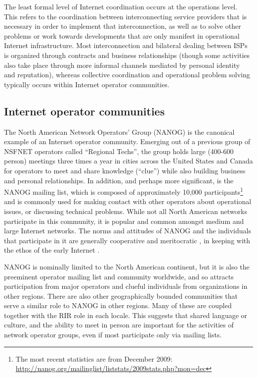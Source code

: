 The least formal level of Internet coordination occurs at the operations level.
This refers to the coordination between interconnecting service providers that
is necessary in order to implement that interconnection, as well as to solve
other problems or work towards developments that are only manifest in
operational Internet infrastructure. Most interconnection and bilateral dealing
between ISPs is organized through contracts and business relationships (though
some activities also take place through more informal channels mediated by
personal identity and reputation), whereas collective coordination and
operational problem solving typically occurs within Internet operator
communities.

\subsection{Internet operator communities}

The North American Network Operators' Group (NANOG) is the canonical example of
an Internet operator community. Emerging out of a previous group of NSFNET
operators called ``Regional Techs'', the group holds large (400-600 person)
meetings three times a year in cities across the United States and Canada for
operators to meet and share knowledge (``clue'') while also building business
and personal relationships. In addition, and perhaps more significant, is the
NANOG mailing list, which is composed of approximately 10,000
participants\footnote{The most recent statistics are from December 2009:
\url{http://nanog.org/mailinglist/liststats/2009stats.php?mon=dec}} and is
commonly used for making contact with other operators about operational issues,
or discussing technical problems. While not all North American networks
participate in this community, it is popular and common amongst medium and large
Internet networks. The norms and attitudes of NANOG and the individuals that
participate in it are generally cooperative and meritocratic
\cite{Mathew:2010ly}, in keeping with the ethos of the early Internet
\cite{Abbate:2000ve}.

NANOG is nominally limited to the North American continent, but it is also the
preeminent operator mailing list and community worldwide, and so attracts
participation from major operators and clueful individuals from organizations
in other regions. There are also other geographically bounded communities that
serve a similar role to NANOG in other regions. Many of these are coupled
together with the RIR role in each locale. This suggests that shared language
or culture, and the ability to meet in person are important for
the activities of network operator groups, even if most participate only via
mailing lists.


